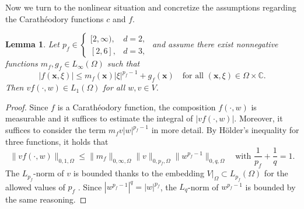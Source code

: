 \documentclass[12pt,DIV=14]{scrartcl}
\newtheorem{lemma}[definition]{Lemma}
\providecommand{\C}{\mathbb{C}}
\providecommand{\Om}{\Omega}
\providecommand{\vecx}{\boldsymbol{x}}
\begin{document}
Now we turn to the nonlinear situation and concretize the assumptions
regarding the Cara\-th\'{e}o\-dory functions $c$ and $f$.

\begin{lemma}\label{l:f-est}
Let $p_f\in\begin{cases}
[2,\infty), & d=2,\\
[2,6], & d=3,
\end{cases}$
and assume there exist nonnegative functions $m_f,g_f\in L_\infty(\Om)$
such that
\[
|f(\vecx,\xi)|\le m_f(\vecx)|\xi|^{p_f-1} + g_f(\vecx)
\quad\text{for all }
(\vecx,\xi)\in \Om\times\C.
\]
Then $vf(\cdot,w) \in L_1(\Om)$ for all $w,v\in V$.
\end{lemma}
\begin{proof}
Since $f$ is a Carath\'{e}odory function, the composition $f(\cdot,w)$ is measurable
and it suffices to estimate the integral of $|vf(\cdot,w)|$.
Moreover, it suffices to consider the term $m_f v |w|^{p_f-1}$ in more detail.
By H\"{o}lder's inequality for three functions, it holds that
\[
\|vf(\cdot,w)\|_{0,1,\Om}
\le \|m_f\|_{0,\infty,\Om}\|v\|_{0,p_f,\Om}
\|w^{p_f-1}\|_{0,q,\Om}
\quad\text{with }
\frac{1}{p_f}+\frac{1}{q}=1.
\]
The $L_{p_f}$-norm of $v$ is bounded thanks to the embedding
$V|_\Om\subset L_{p_f}(\Om)$ for the allowed values of $p_f$ \cite[Thm.~4.12]{Adams:03}.
Since $|w^{p_f-1}|^q=|w|^{p_f}$, the $L_q$-norm of $w^{p_f-1}$ is bounded by the same reasoning.
\end{proof}
\end{document}

